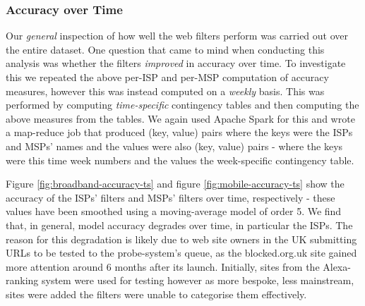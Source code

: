\documentclass{bmcart}
\begin{document}


\subsubsection*{Accuracy over Time}
Our \textit{general} inspection of how well the web filters perform was carried out over the entire dataset.
One question that came to mind when conducting this analysis was whether the filters \textit{improved} in accuracy over time.
To investigate this we repeated the above per-ISP and per-MSP computation of accuracy measures, however this was instead computed on a \textit{weekly} basis.
This was performed by computing \textit{time-specific} contingency tables and then computing the above measures from the tables.
We again used Apache Spark for this and wrote a map-reduce job that produced (key, value) pairs where the keys were the ISPs and MSPs' names and the values were also (key, value) pairs - where the keys were this time week numbers and the values the week-specific contingency table.

Figure \ref{fig:broadband-accuracy-ts} and figure \ref{fig:mobile-accuracy-ts} show the accuracy of the ISPs' filters and MSPs' filters over time, respectively - these values have been smoothed using a moving-average model of order 5.
We find that, in general, model accuracy degrades over time, in particular the ISPs.
The reason for this degradation is likely due to web site owners in the UK submitting URLs to be tested to the probe-system's queue, as the blocked.org.uk site gained more attention around 6 months after its launch.
Initially, sites from the Alexa-ranking system were used for testing however as more bespoke, less mainstream, sites were added the filters were unable to categorise them effectively.
\end{document}

